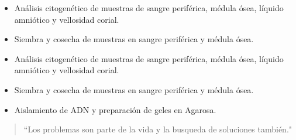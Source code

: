 \documentclass[10pt,a4paper,ragged2e,]{altacv}
\begin{document}
\divider

\begin{itemize}
\item Análisis citogenético de muestras de sangre periférica, médula ósea, líquido amniótico y vellosidad corial.
\item Siembra y cosecha de muestras en sangre periférica y médula ósea.
\end{itemize}

\divider


\begin{itemize}
\item Análisis citogenético de muestras de sangre periférica, médula ósea, líquido amniótico y vellosidad corial.
\item Siembra y cosecha de muestras en sangre periférica y médula ósea.
\item Aislamiento de ADN y preparación de geles en Agarosa.

\end{itemize}





\begin{quote}
``Los problemas son parte de la vida y la busqueda de soluciones también."
\end{quote}


\end{document}
